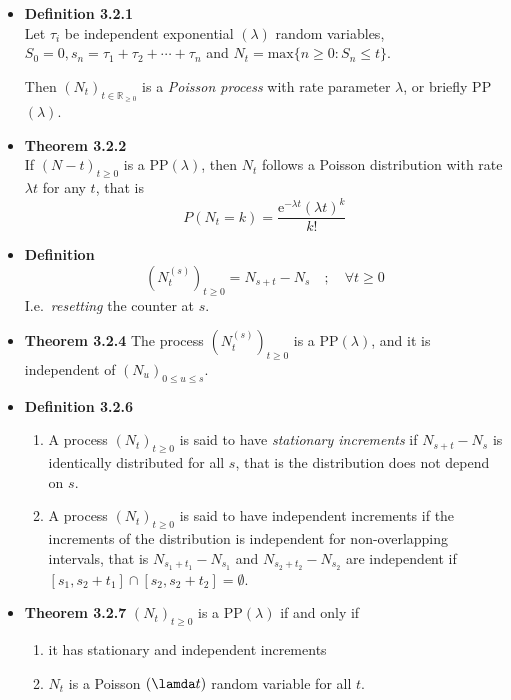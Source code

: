 \documentclass[11pt,a4paper]{article}
\begin{document}
\begin{itemize}

    \item \textbf{Definition 3.2.1} \\
        Let $\tau_i$ be independent exponential $(\lambda)$ random variables,
        $S_0 = 0, s_n = \tau_1 + \tau_2 + \cdots + \tau_n$ and
        $N_t = \text{max}\{n \geq 0 : S_n \leq t \}$.

        Then ${(N_t)}_{t \in \mathbb{R}_{\geq 0}}$ is a \emph{Poisson process} with rate parameter
        $\lambda$, or briefly PP$(\lambda)$.

    \item \textbf{Theorem 3.2.2} \\
        If ${(N-t)}_{t \geq 0}$ is a $\mathrm{PP}(\lambda)$,
        then $N_t$ follows a Poisson distribution with rate $\lambda t$ for any $t$,
        that is
        \[
            P(N_t = k) = \frac{\mathrm{e}^{-\lambda t} {(\lambda t)}^k}{k!}
        \]

    \item \textbf{Definition}
        \[
            {\left(N_t^{(s)}\right)}_{t\geq 0} = N_{s+t} - N_s \quad ; \quad \forall t \geq 0
        \]
        I.e.\ \emph{resetting} the counter at $s$.

    \item \textbf{Theorem 3.2.4}
        The process ${(N_t^{(s)})}_{t \geq 0}$ is a $\mathrm{PP}(\lambda)$,
        and it is independent of ${(N_u)}_{0 \leq u \leq s}$.

    \item \textbf{Definition 3.2.6}
        \begin{enumerate}
            \item A process ${(N_t)}_{t\geq 0}$ is said to have \emph{stationary increments}
                if $N_{s+t} - N_s$ is identically distributed for all $s$,
                that is the distribution does not depend on $s$.
            \item A process ${(N_t)}_{t\geq 0}$ is said to have independent increments if the
                increments of the distribution is independent for non-overlapping intervals,
                that is $N_{s_1 + t_1} - N_{s_1}$ and $N_{s_2 + t_2} - N_{s_2}$
                are independent if $[s_1,s_2 + t_1] \cap [s_2, s_2 + t_2] = \emptyset$.
        \end{enumerate}

    \item \textbf{Theorem 3.2.7}
        ${(N_t)}_{t \geq 0}$ is a $\mathrm{PP}(\lambda)$ if and only if
        \begin{enumerate}
            \item it has stationary and independent increments
            \item $N_t$ is a Poisson $(\lamda t)$ random variable for all $t$.
        \end{enumerate}


\end{itemize}
\end{document}
